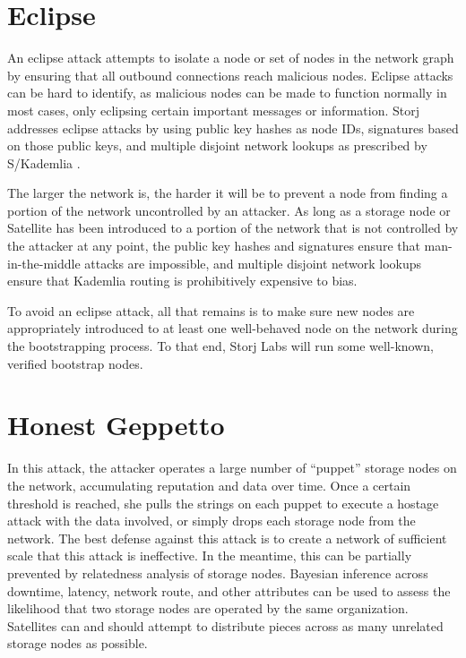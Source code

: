 \documentclass[8pt,fleqn,openany]{book}
\begin{document}
\section{Eclipse}

An eclipse attack attempts to isolate a node or set of nodes in the network
graph by ensuring that all outbound connections reach malicious nodes. Eclipse
attacks can be hard to identify, as malicious nodes can be made to function
normally in most cases, only eclipsing certain important messages or
information. Storj addresses eclipse attacks by using public key hashes as node
IDs, signatures based on those public keys, and multiple disjoint network
lookups as prescribed by S/Kademlia \cite{skad}.

The larger the network is, the harder it will
be to prevent a node from finding a portion of the network uncontrolled by
an attacker.
As long as a storage node or Satellite has been introduced to a portion of
the network that is not controlled by the attacker at any point, the public
key hashes and signatures ensure that man-in-the-middle attacks are impossible,
and multiple disjoint network lookups ensure that Kademlia routing is
prohibitively expensive to bias.

To avoid an eclipse attack, all that remains
is to make sure new nodes are appropriately introduced to at least one
well-behaved node on the network during the bootstrapping process.
To that end, Storj Labs will run some well-known, verified bootstrap nodes.

\section{Honest Geppetto}

In this attack,
the attacker operates a large number of ``puppet'' storage nodes on the network,
accumulating reputation and data over time. Once a certain threshold is reached,
she pulls the strings on each puppet to execute a hostage attack with the data
involved, or simply drops each storage node from the network. The best defense
against this attack is to create a network of sufficient scale that this attack
is ineffective. In the meantime, this can be partially prevented by relatedness
analysis of storage nodes. Bayesian inference across downtime, latency, network
route, and other
attributes can be used to assess the likelihood that two storage nodes are
operated by the same organization. Satellites can and should attempt to
distribute pieces across as many unrelated storage nodes as possible.
\end{document}
